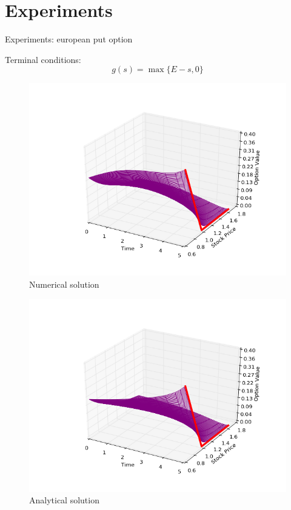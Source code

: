 \documentclass{beamer}
\theoremstyle{definition}
\theoremstyle{plain}
\theoremstyle{remark}
\begin{document}
	\section{Experiments}
						
		\begin{frame}{Experiments: european put option}
		
				 	Terminal conditions:
		 \[
			g(s)=\max\{ E-s,0 \}	 
		 \]	
			\begin{minipage}{\linewidth}
      \centering
      \begin{minipage}{0.45\linewidth}
          \begin{figure}[H]
              \includegraphics[width=\linewidth]{Figures/eu-put}
              \caption{Numerical solution}
          \end{figure}
      \end{minipage}
      \hspace{0.05\linewidth}
      \begin{minipage}{0.45\linewidth}
          \begin{figure}[H]
              \includegraphics[width=\linewidth]{Figures/eu-put-analyt}
              \caption{Analytical solution}
          \end{figure}
      \end{minipage}
  \end{minipage}
 	\end{frame}
\end{document}
